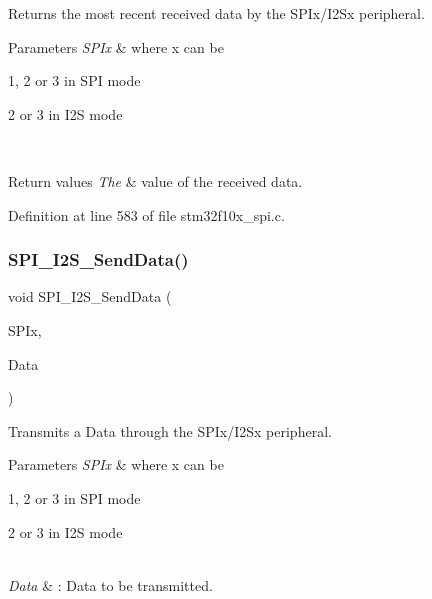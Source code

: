 Returns the most recent received data by the S\+P\+Ix/\+I2\+Sx peripheral. 


\begin{DoxyParams}{Parameters}
{\em S\+P\+Ix} & where x can be
\begin{DoxyItemize}
\item 1, 2 or 3 in S\+PI mode
\item 2 or 3 in I2S mode 
\end{DoxyItemize}\\
\hline
\end{DoxyParams}

\begin{DoxyRetVals}{Return values}
{\em The} & value of the received data. \\
\hline
\end{DoxyRetVals}


Definition at line 583 of file stm32f10x\+\_\+spi.\+c.

\mbox{\label{group___s_p_i___exported___functions_gad5af40bebe8dbe3fa8bd476489d7e3da}} 
\subsubsection{\texorpdfstring{S\+P\+I\+\_\+\+I2\+S\+\_\+\+Send\+Data()}{SPI\_I2S\_SendData()}}
{\footnotesize\ttfamily void S\+P\+I\+\_\+\+I2\+S\+\_\+\+Send\+Data (\begin{DoxyParamCaption}\item[{\hyperlink{struct_s_p_i___type_def}{S\+P\+I\+\_\+\+Type\+Def} $\ast$}]{S\+P\+Ix,  }\item[{uint16\+\_\+t}]{Data }\end{DoxyParamCaption})}



Transmits a Data through the S\+P\+Ix/\+I2\+Sx peripheral. 


\begin{DoxyParams}{Parameters}
{\em S\+P\+Ix} & where x can be
\begin{DoxyItemize}
\item 1, 2 or 3 in S\+PI mode
\item 2 or 3 in I2S mode 
\end{DoxyItemize}\\
\hline
{\em Data} & \+: Data to be transmitted. \\
\hline
\end{DoxyParams}


